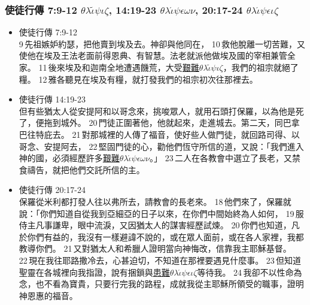 \subsubsection{使徒行傳 7:9-12 $\theta$$\lambda$$\tilde{\iota}$$\psi$$\iota$$\zeta$, 14:19-23 $\theta$$\lambda$$\acute{\iota}$$\psi$$\epsilon$$\omega$$\nu$, 20:17-24 $\theta$$\lambda$$\acute{\iota}$$\psi$$\epsilon$$\iota$$\zeta$} 
\begin{itemize} 
\itemsep-.25em
\item{使徒行傳 7:9-12}\\  9 先祖嫉妒約瑟，把他賣到埃及去。神卻與他同在， 10 救他脫離一切苦難，又使他在埃及王法老面前得恩典、有智慧。法老就派他做埃及國的宰相兼管全家。 11 後來埃及和迦南全地遭遇饑荒，大受\underline{艱難$\theta$$\lambda$$\tilde{\iota}$$\psi$$\iota$$\zeta$}，我們的祖宗就絕了糧。 12 雅各聽見在埃及有糧，就打發我們的祖宗初次往那裡去。
\item{使徒行傳 14:19-23} \\
 但有些猶太人從安提阿和以哥念來，挑唆眾人，就用石頭打保羅，以為他是死了，便拖到城外。 20 門徒正圍著他，他就起來，走進城去。第二天，同巴拿巴往特庇去。 21 對那城裡的人傳了福音，使好些人做門徒，就回路司得、以哥念、安提阿去， 22 堅固門徒的心，勸他們恆守所信的道，又說：「我們進入神的國，必須經歷許多\underline{艱難$\theta$$\lambda$$\acute{\iota}$$\psi$$\epsilon$$\omega$$\nu$}。」 23 二人在各教會中選立了長老，又禁食禱告，就把他們交託所信的主。
\item{使徒行傳 20:17-24} \\
保羅從米利都打發人往以弗所去，請教會的長老來。 18 他們來了，保羅就說：「你們知道自從我到亞細亞的日子以來，在你們中間始終為人如何， 19 服侍主凡事謙卑，眼中流淚，又因猶太人的謀害經歷試煉。 20 你們也知道，凡於你們有益的，我沒有一樣避諱不說的，或在眾人面前，或在各人家裡，我都教導你們。 21 又對猶太人和希臘人證明當向神悔改，信靠我主耶穌基督。 22 現在我往耶路撒冷去，心甚迫切，不知道在那裡要遇見什麼事。 23 但知道聖靈在各城裡向我指證，說有捆鎖與\underline{患難$\theta$$\lambda$$\acute{\iota}$$\psi$$\epsilon$$\iota$$\zeta$}等待我。 24 我卻不以性命為念，也不看為寶貴，只要行完我的路程，成就我從主耶穌所領受的職事，證明神恩惠的福音。 
 \end{itemize}
 
 

